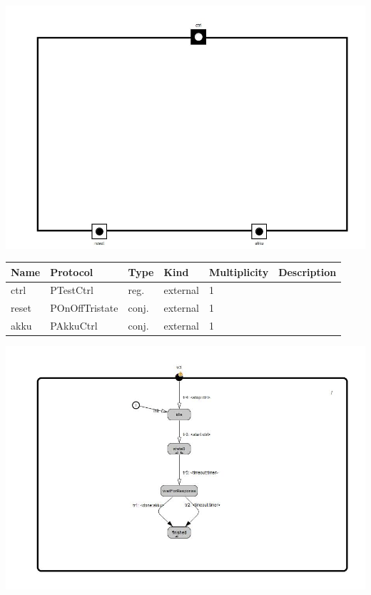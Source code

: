 
{
\centering{}
\includegraphics[width=1.0\textwidth]{./images/ABasicCommunicationTest_structure.jpg}
}

\begin{tabular}[ht]{|l|l|l|l|l|p{5cm}|}
\hline
\textbf{Name} & \textbf{Protocol} & \textbf{Type} & \textbf{Kind} & \textbf{Multiplicity} & \textbf{Description}\\
\hline
ctrl & PTestCtrl & reg. & external & 1 & \\
\hline
reset & POnOffTristate & conj. & external & 1 & \\
\hline
akku & PAkkuCtrl & conj. & external & 1 & \\
\hline
\end{tabular}

{
\centering{}
\includegraphics[width=1.0\textwidth]{./images/ABasicCommunicationTest_behavior.jpg}
}


